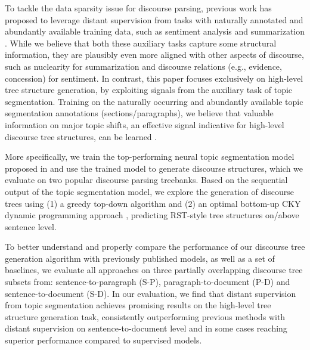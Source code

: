 \documentclass[letterpaper]{article} %
\begin{document}
To tackle the data sparsity issue for discourse parsing, previous work has proposed to leverage distant supervision
from tasks with naturally annotated and abundantly available training data, such as sentiment analysis \cite{huber-carenini-2020-mega} and summarization \cite{xiao2021predicting}. While we believe that both these auxiliary tasks capture some structural information, they are plausibly even more aligned with other aspects of discourse, such as nuclearity for summarization and discourse relations (e.g., evidence, concession) for sentiment.
In contrast, this paper focuses exclusively on high-level tree structure generation, by exploiting signals from the auxiliary task of topic segmentation. Training on the naturally occurring and abundantly available topic segmentation annotations (sections/paragraphs), we believe that valuable information on major topic shifts, an effective signal indicative for high-level discourse tree structures, can be learned \cite{stede2011discourse}.

More specifically, we train the top-performing neural topic segmentation model proposed in \citet{xing-etal-2020-improving} and use the trained model to generate discourse structures, which we evaluate on two popular discourse parsing treebanks. Based on the sequential output of the topic segmentation model, we explore the generation of discourse trees using (1) a greedy top-down algorithm and (2) an optimal bottom-up CKY dynamic programming approach \cite{jurafsky2014speech}, predicting RST-style tree structures on/above sentence level.

To better understand and properly compare the performance of our discourse tree generation algorithm with previously published
models, as well as a set of baselines, we evaluate all approaches on three partially overlapping discourse tree subsets from: sentence-to-paragraph (S-P), paragraph-to-document (P-D) and sentence-to-document (S-D). In our evaluation, we find that distant supervision from topic segmentation achieves promising results on the high-level tree structure generation task, consistently outperforming previous methods with distant supervision on sentence-to-document level and in some cases reaching superior performance compared to supervised models.
\end{document}
